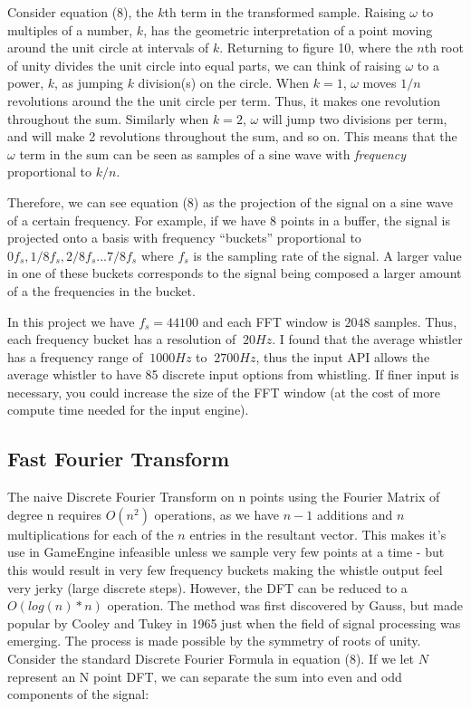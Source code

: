 \documentclass[DIV=calc, paper=a4, fontsize=11pt, twocolumn]{scrartcl}   %
\begin{document}
Consider equation (8), the $k$th term in the transformed sample. Raising $\omega$ to multiples of a number, $k$, has the geometric interpretation of a point moving around the unit circle at intervals of $k$. Returning to figure 10, where the $n$th root of unity divides the unit circle into equal parts, we can think of raising $\omega$ to a power, $k$, as jumping $k$ division(s) on the circle. When $k = 1$, $\omega$ moves $1/n$ revolutions around the the unit circle per term. Thus, it makes one revolution throughout the sum. Similarly when $k=2$, $\omega$ will jump two divisions per term, and will make 2 revolutions throughout the sum, and so on. This means that the $\omega$ term in the sum can be seen as samples of a sine wave with \textit{frequency} proportional to $k/n$.
\par
Therefore, we can see equation (8) as the projection of the signal on a sine wave of a certain frequency. For example, if we have 8 points in a buffer, the signal is projected onto a basis with frequency ``buckets'' proportional to $0f_s,1/8f_s,2/8f_s...7/8f_s$ where $f_s$ is the sampling rate of the signal. A larger value in one of these buckets corresponds to the signal being composed a larger amount of a the frequencies in the bucket.

\par
In this project we have $f_s=44100$ and each FFT window is $2048$ samples. Thus, each frequency bucket has a resolution of $~20Hz$. I found that the average whistler has a frequency range of $~1000Hz$ to $~2700Hz$, thus the input API allows the average whistler to have 85 discrete input options from whistling. If finer input is necessary, you could increase the size of the FFT window (at the cost of more compute time needed for the input engine).


\subsection{Fast Fourier Transform}

The naive Discrete Fourier Transform on n points using the Fourier Matrix of degree n requires $O(n^2)$ operations, as we have $n-1$ additions and $n$ multiplications for each of the $n$ entries in the resultant vector. This makes it's use in GameEngine infeasible unless we sample very few points at a time - but this would result in very few frequency buckets making the whistle output feel very jerky (large discrete steps). However, the DFT can be reduced to a $O(log(n)*n)$ operation. The method was first discovered by Gauss, but made popular by Cooley and Tukey in 1965 just when the field of signal processing was emerging. The process is made possible by the symmetry of roots of unity. Consider the standard Discrete Fourier Formula in equation (8). If we let $N$ represent an N point DFT, we can separate the sum into even and odd components of the signal:
\end{document}
